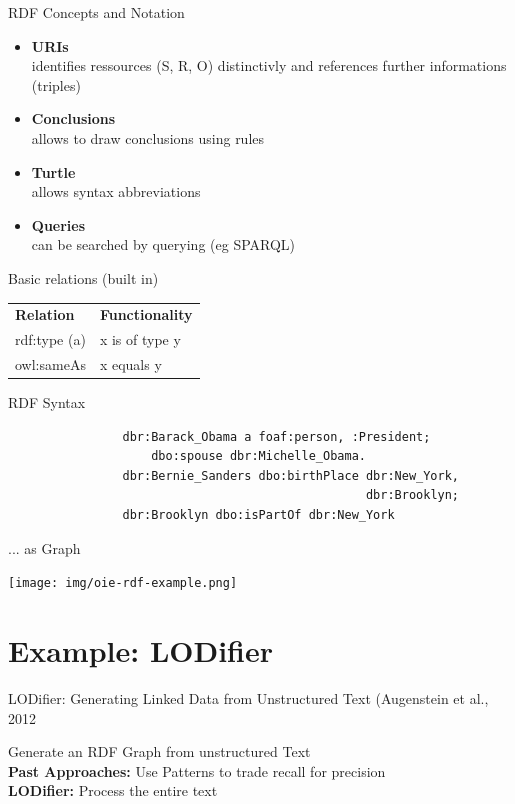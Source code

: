 \documentclass[11pt]{beamer}
\begin{document}
		\begin{frame}{RDF Concepts and Notation}
			\begin{itemize}
				\item \textbf{URIs}\\
					identifies ressources (S, R, O) distinctivly and references further informations (triples)
				\item \textbf{Conclusions}\\
					allows to draw conclusions using rules
				\item \textbf{Turtle}\\
					allows syntax abbreviations
				\item \textbf{Queries}\\
					can be searched by querying (eg SPARQL)
				
			\end{itemize}
		\end{frame}
		
		\begin{frame}{Basic relations (built in)}
			\begin{table}[]
				\centering
				\begin{tabular}{ll}
				\textbf{Relation} & \textbf{Functionality} \\
				rdf:type (a)      & x is of type y         \\
				owl:sameAs        & x equals y           	
				\end{tabular}
			\end{table}
		\end{frame}
		
		\begin{frame}[fragile]{RDF Syntax}
			\begin{verbatim}
				dbr:Barack_Obama a foaf:person, :President;
				    dbo:spouse dbr:Michelle_Obama.
				dbr:Bernie_Sanders dbo:birthPlace dbr:New_York, 
				                                  dbr:Brooklyn;
				dbr:Brooklyn dbo:isPartOf dbr:New_York 	
			\end{verbatim}
		\end{frame}
		
		\begin{frame}{... as Graph}
			\begin{center}
				\texttt{[image: img/oie-rdf-example.png]}
			\end{center}			
		\end{frame}
\section{Example: LODifier}
	\begin{frame}{LODifier: Generating Linked Data from Unstructured Text (Augenstein et al., 2012}
		\begin{center}
			Generate an RDF Graph from unstructured Text\\
			\vspace{15pt}
			\textbf{Past Approaches:} Use Patterns to trade recall for precision\\
			\textbf{LODifier:} Process the entire text
		\end{center}
	\end{frame}
\end{document}
